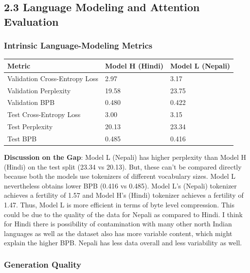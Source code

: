 \documentclass[10pt,a4paper]{article}
\begin{document}
\subsection{2.3 Language Modeling and Attention Evaluation}

\subsubsection{Intrinsic Language-Modeling Metrics}

\begin{center}
\small
\begin{longtable}{l l l}
\toprule
Metric & Model H (Hindi) & Model L (Nepali) \\
\midrule
\endhead
Validation Cross-Entropy Loss & 2.97 & 3.17 \\
Validation Perplexity & 19.58 & 23.75 \\
Validation BPB & 0.480 & 0.422 \\
Test Cross-Entropy Loss & 3.00 & 3.15 \\
Test Perplexity & 20.13 & 23.34 \\
Test BPB & 0.485 & 0.416 \\
\bottomrule
\end{longtable}
\end{center}

\textbf{Discussion on the Gap}:
Model L (Nepali) has higher perplexity than Model H (Hindi) on the test split (23.34 vs 20.13). But, these can't be compared directly because both the models use tokenizers of different vocabulary sizes. Model L nevertheless obtains lower BPB (0.416 vs 0.485). Model L's (Nepali) tokenizer achieves a fertility of 1.57 and Model H's (Hindi) tokenizer achieves a fertility of 1.47. Thus, Model L is more efficient in terms of byte level compression. This could be due to the quality of the data for Nepali as compared to Hindi. I think for Hindi there is possibility of contamination with many other north Indian languages as well as the dataset also has more variable content, which might explain the higher BPB. Nepali has less data overall and less variability as well.

\subsubsection{Generation Quality}
\end{document}
